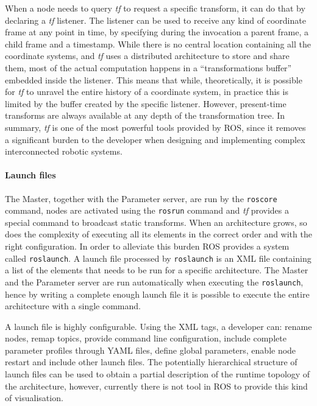 When a node needs to query \textit{tf} to request a specific transform, it can do that by declaring a \textit{tf} listener. The listener can be used to receive any kind of coordinate frame at any point in time, by specifying during the invocation a parent frame, a child frame and a timestamp. While there is no central location containing all the coordinate systems, and \textit{tf} uses a distributed architecture to store and share them, most of the actual computation happens in a ``transformations buffer'' embedded inside the listener. This means that while, theoretically, it is possible for \textit{tf} to unravel the entire history of a coordinate system, in practice this is limited by the buffer created by the specific listener. However, present-time transforms are always available at any depth of the transformation tree. In summary, \textit{tf} is one of the most powerful tools provided by ROS, since it removes a significant burden to the developer when designing and implementing complex interconnected robotic systems.

\paragraph{Launch files} The Master, together with the Parameter server, are run by the \texttt{roscore} command, nodes are activated using the \texttt{rosrun} command and \textit{tf} provides a special command to broadcast static transforms. When an architecture grows, so does the complexity of executing all its elements in the correct order and with the right configuration. In order to alleviate this burden ROS provides a system called \texttt{roslaunch}. A launch file processed by \texttt{roslaunch} is an XML file containing a list of the elements that needs to be run for a specific architecture. The Master and the Parameter server are run automatically when executing the \texttt{roslaunch}, hence by writing a complete enough launch file it is possible to execute the entire architecture with a single command.

A launch file is highly configurable. Using the XML tags, a developer can: rename nodes, remap topics, provide command line configuration, include complete parameter profiles through YAML files, define global parameters, enable node restart and include other launch files. The potentially hierarchical structure of launch files can be used to obtain a partial description of the runtime topology of the architecture, however, currently there is not tool in ROS to provide this kind of visualisation.

